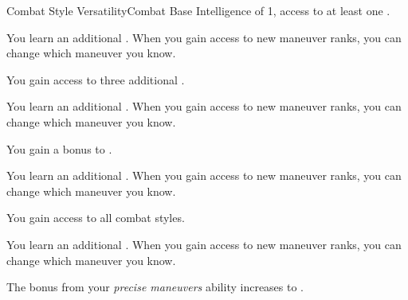     \begin{feat}{Combat Style Versatility}{Combat}
        \featpre Base Intelligence of 1, access to at least one .

         You learn an additional .
        When you gain access to new maneuver ranks, you can change which maneuver you know.

         You gain access to three additional .

         You learn an additional .
        When you gain access to new maneuver ranks, you can change which maneuver you know.

         You gain a  bonus to .

         You learn an additional .
        When you gain access to new maneuver ranks, you can change which maneuver you know.

         You gain access to all combat styles.

         You learn an additional .
        When you gain access to new maneuver ranks, you can change which maneuver you know.

         The bonus from your \textit{precise maneuvers} ability increases to .
    \end{feat}

